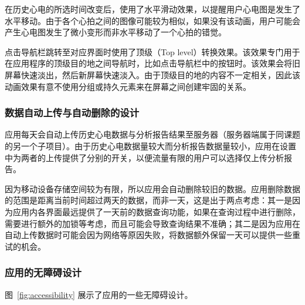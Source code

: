 在历史心电的所选时间改变后，使用了水平滑动效果，以提醒用户心电图是发生了水平移动。由于各个心拍之间的图像可能较为相似，如果没有该动画，用户可能会产生心电图发生了微小变形而非水平移动了一个心拍的错觉。

点击导航栏跳转至对应界面时使用了顶级（Top level）转换效果。该效果专门用于在应用程序的顶级目的地之间导航时，比如点击导航栏中的按钮时。该效果会将旧屏幕快速淡出，然后新屏幕快速淡入。由于顶级目的地的内容不一定相关，因此该动画效果有意不使用分组或持久元素来在屏幕之间创建牢固的关系。

\subsubsection{数据自动上传与自动删除的设计}\label{subsubsec:data-auto-design}

应用每天会自动上传历史心电数据与分析报告结果至服务器（服务器端属于同课题的另一个子项目）。由于历史心电数据量较大而分析报告数据量较小，应用在设置中为两者的上传提供了分别的开关，以便流量有限的用户可以选择仅上传分析报告。

因为移动设备存储空间较为有限，所以应用会自动删除较旧的数据。应用删除数据的范围是距离当前时间超过两天的数据，而非一天，这是出于两点考虑：其一是因为应用内各界面最远提供了一天前的数据查询功能，如果在查询过程中进行删除，需要进行额外的加锁等考虑，而且可能会导致查询结果不准确；其二是因为应用在自动上传数据时可能会因为网络等原因失败，将数据额外保留一天可以提供一些重试的机会。

\subsubsection{应用的无障碍设计}\label{subsubsec:accessibility-design}

图~\ref{fig:accessibility} 展示了应用的一些无障碍设计。


